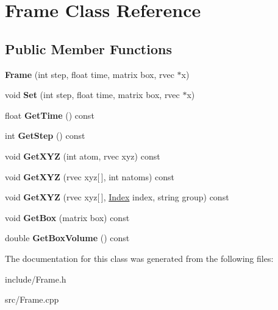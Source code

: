 \hypertarget{classFrame}{\section{Frame Class Reference}
\label{classFrame}
}
\subsection*{Public Member Functions}
\begin{DoxyCompactItemize}
\item 
\hypertarget{classFrame_a0f3ba7abc832b6ca9d0401a9e5cfc4a0}{{\bfseries Frame} (int step, float time, matrix box, rvec $\ast$x)}\label{classFrame_a0f3ba7abc832b6ca9d0401a9e5cfc4a0}

\item 
\hypertarget{classFrame_affdb660765a1737e7c838c74e307d707}{void {\bfseries Set} (int step, float time, matrix box, rvec $\ast$x)}\label{classFrame_affdb660765a1737e7c838c74e307d707}

\item 
\hypertarget{classFrame_a9125c618fbb0791eab0576086cb562d6}{float {\bfseries Get\-Time} () const }\label{classFrame_a9125c618fbb0791eab0576086cb562d6}

\item 
\hypertarget{classFrame_a4b383d191c043db5ee263446a2ea7a71}{int {\bfseries Get\-Step} () const }\label{classFrame_a4b383d191c043db5ee263446a2ea7a71}

\item 
\hypertarget{classFrame_ad893a259ad39ca2ae393ebb2a3772e0b}{void {\bfseries Get\-X\-Y\-Z} (int atom, rvec xyz) const }\label{classFrame_ad893a259ad39ca2ae393ebb2a3772e0b}

\item 
\hypertarget{classFrame_a57fe1db79f90b9ac76403218575ce0c6}{void {\bfseries Get\-X\-Y\-Z} (rvec xyz\mbox{[}$\,$\mbox{]}, int natoms) const }\label{classFrame_a57fe1db79f90b9ac76403218575ce0c6}

\item 
\hypertarget{classFrame_a0ae40ed48c27658e81db14f76e60c0ad}{void {\bfseries Get\-X\-Y\-Z} (rvec xyz\mbox{[}$\,$\mbox{]}, \hyperlink{classIndex}{Index} index, string group) const }\label{classFrame_a0ae40ed48c27658e81db14f76e60c0ad}

\item 
\hypertarget{classFrame_a7b747f3795eb785eb9275f1c793c6695}{void {\bfseries Get\-Box} (matrix box) const }\label{classFrame_a7b747f3795eb785eb9275f1c793c6695}

\item 
\hypertarget{classFrame_a3676c3640f6047a77e5671f7171ba5f3}{double {\bfseries Get\-Box\-Volume} () const }\label{classFrame_a3676c3640f6047a77e5671f7171ba5f3}

\end{DoxyCompactItemize}


The documentation for this class was generated from the following files\-:\begin{DoxyCompactItemize}
\item 
include/Frame.\-h\item 
src/Frame.\-cpp\end{DoxyCompactItemize}
